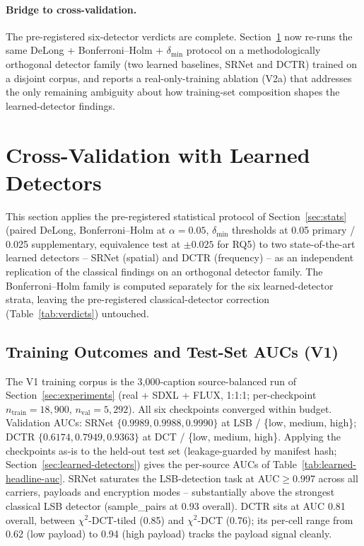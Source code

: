 \documentclass[10pt,twocolumn,a4paper]{article}
\begin{document}
\paragraph{Bridge to cross-validation.} The pre-registered six-detector verdicts are complete. Section~\ref{sec:learnedxval} now re-runs the same DeLong + Bonferroni--Holm + $\delta_\text{min}$ protocol on a methodologically orthogonal detector family (two learned baselines, SRNet and DCTR) trained on a disjoint corpus, and reports a real-only-training ablation (V2a) that addresses the only remaining ambiguity about how training-set composition shapes the learned-detector findings.

\section{Cross-Validation with Learned Detectors}
\label{sec:learnedxval}

This section applies the pre-registered statistical protocol of Section~\ref{sec:stats} (paired DeLong, Bonferroni--Holm at $\alpha\!=\!0.05$, $\delta_\text{min}$ thresholds at 0.05 primary / 0.025 supplementary, equivalence test at $\pm 0.025$ for RQ5) to two state-of-the-art learned detectors -- SRNet (spatial) and DCTR (frequency) -- as an independent replication of the classical findings on an orthogonal detector family. The Bonferroni--Holm family is computed separately for the six learned-detector strata, leaving the pre-registered classical-detector correction (Table~\ref{tab:verdicts}) untouched.

\subsection{Training Outcomes and Test-Set AUCs (V1)}
\label{sec:v1-train}

The V1 training corpus is the 3{,}000-caption source-balanced run of Section~\ref{sec:experiments} (real + SDXL + FLUX, 1:1:1; per-checkpoint $n_\text{train}\!=\!18{,}900$, $n_\text{val}\!=\!5{,}292$). All six checkpoints converged within budget. Validation AUCs: SRNet $\{0.9989, 0.9988, 0.9990\}$ at LSB / \{low, medium, high\}; DCTR $\{0.6174, 0.7949, 0.9363\}$ at DCT / \{low, medium, high\}. Applying the checkpoints as-is to the held-out test set (leakage-guarded by manifest hash; Section~\ref{sec:learned-detectors}) gives the per-source AUCs of Table~\ref{tab:learned-headline-auc}. SRNet saturates the LSB-detection task at AUC$\geq$0.997 across all carriers, payloads and encryption modes -- substantially above the strongest classical LSB detector (sample\_pairs at 0.93 overall). DCTR sits at AUC 0.81 overall, between $\chi^2$-DCT-tiled (0.85) and $\chi^2$-DCT (0.76); its per-cell range from 0.62 (low payload) to 0.94 (high payload) tracks the payload signal cleanly.
\end{document}
